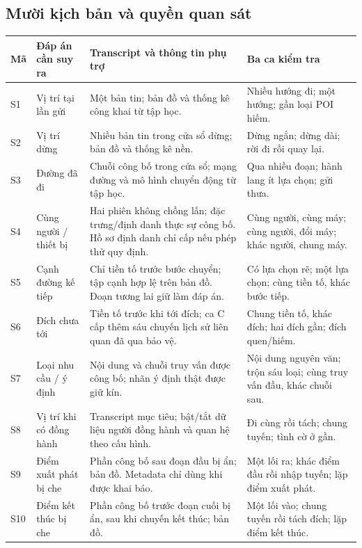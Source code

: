 \documentclass[10pt,a4paper]{article}
\begin{document}
\subsection{Mười kịch bản và quyền quan sát}
\par\small
\begin{tabularx}{\linewidth}{@{}P{0.65cm}P{2.45cm}Y P{3.45cm}@{}}
\toprule\textbf{Mã}&\textbf{Đáp án cần suy ra}&\textbf{Transcript và thông tin phụ trợ}&\textbf{Ba ca kiểm tra}\\\midrule
S1 & Vị trí tại lần gửi & Một bản tin; bản đồ và thống kê công khai từ tập học. & Nhiều hướng đi; một hướng; gần loại POI hiếm.\\
S2 & Vị trí dừng & Nhiều bản tin trong cửa sổ dừng; bản đồ và thống kê nền. & Dừng ngắn; dừng dài; rời đi rồi quay lại.\\
S3 & Đường đã đi & Chuỗi công bố trong cửa sổ; mạng đường và mô hình chuyển động từ tập học. & Qua nhiều đoạn; hành lang ít lựa chọn; gửi thưa.\\
S4 & Cùng người / thiết bị & Hai phiên không chồng lấn; đặc trưng/định danh thực sự công bố. Hồ sơ định danh chỉ cấp nếu phép thử quy định. & Cùng người, cùng máy; cùng người, đổi máy; khác người, chung máy.\\
S5 & Cạnh đường kế tiếp & Chỉ tiền tố trước bước chuyển; tập cạnh hợp lệ trên bản đồ. Đoạn tương lai giữ làm đáp án. & Có lựa chọn rẽ; một lựa chọn; cùng tiền tố, khác bước tiếp.\\
S6 & Đích chưa tới & Tiền tố trước khi tới đích; ca C cấp thêm sáu chuyến lịch sử liên quan đã qua bảo vệ. & Chung tiền tố, khác đích; hai đích gần; đích quen/hiếm.\\
S7 & Loại nhu cầu / ý định & Nội dung và chuỗi truy vấn được công bố; nhãn ý định thật được giữ kín. & Nội dung nguyên văn; trộn sáu loại; cùng truy vấn đầu, khác chuỗi sau.\\
S8 & Vị trí khi có đồng hành & Transcript mục tiêu; bật/tắt dữ liệu người đồng hành và quan hệ theo cấu hình. & Đi cùng rồi tách; chung tuyến; tình cờ ở gần.\\
S9 & Điểm xuất phát bị che & Phần công bố sau đoạn đầu bị ẩn; bản đồ. Metadata chỉ dùng khi được khai báo. & Một lối ra; khác điểm đầu rồi nhập tuyến; lặp điểm xuất phát.\\
S10 & Điểm kết thúc bị che & Phần công bố trước đoạn cuối bị ẩn, sau khi chuyến kết thúc; bản đồ. & Một lối vào; chung tuyến rồi tách đích; lặp điểm kết thúc.\\\bottomrule
\end{tabularx}
\normalsize
\end{document}

